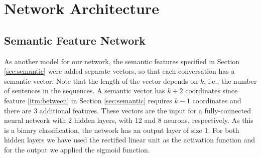 \section{Network Architecture}\label{sec:network}

\subsection{Semantic Feature Network}
As another model for our network, 
the semantic features specified in Section \ref{sec:semantic} 
were added separate vectors, so that 
each conversation has a semantic vector. 
Note that the length of the vector depends on $k$, 
i.e., the number of sentences in the sequences. 
A semantic vector has $k+2$ coordinates since feature \ref{itm:between} in Section \ref{sec:semantic} requires $k-1$ coordinates 
and there are $3$ additional features. 
These vectors are the input for a fully-connected neural 
network with 2 hidden layers, with 12 and 8 neurons, respectively. 
As this is a binary classification, the network has an output layer of size 1. 
For both hidden layers we have used the rectified linear unit as the activation 
function and for the output we applied the sigmoid function.

